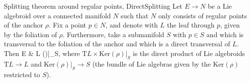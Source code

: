 %
%
%

\begin{theorems}{Splitting theorem around regular points, \cite[Corollary 4.2]{meinrenkensplitting}}{DirectSplitting}
Let $E \to N$ be a Lie algebroid over a connected manifold $N$ such that $N$ only consists of regular points of the anchor $\rho$. Fix a point $p \in N$, and denote with $L$ the leaf through $p$, given by the foliation of $\rho$. Furthermore, take a submanifold $S$ with $p \in S$ and which is transversal to the foliation of the anchor and which is a direct transversal of $L$. Then
\ba
E
&
L \times {}(\rho)|_S,
\ea
where $\mathrm{T}L \times \mathrm{Ker}(\rho)|_S$ is the direct product of Lie algebroids $\mathrm{T}L \to L$ and $\mathrm{Ker}(\rho)|_S \to S$ (the bundle of Lie algebras given by the $\mathrm{Ker}(\rho)$ restricted to $S$).
\end{theorems}

